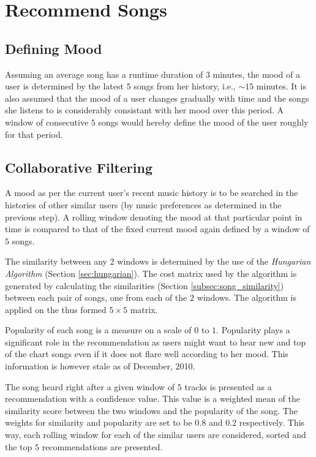 	\section{Recommend Songs}
	\label{sec:recommend}
		\subsection{Defining Mood}
			Assuming an average song has a runtime duration of \(3\) minutes, the mood of a user is determined by the latest \(5\) songs from her history, i.e., $\sim$\(15\) minutes. It is also assumed that the mood of a user changes gradually with time and the songs she listens to is considerably consistant with her mood over this period. A window of consecutive \(5\) songs would hereby define the mood of the user roughly for that period.
			
		\subsection{Collaborative Filtering}
			A mood as per the current user's recent music history is to be searched in the histories of other similar users (by music preferences as determined in the previous step). A rolling window denoting the mood at that particular point in time is compared to that of the fixed current mood again defined by a window of \(5\) songs.
			
			The similarity between any \(2\) windows is determined by the use of the \emph{Hungarian Algorithm} (Section \ref{sec:hungarian}). The cost matrix used by the algorithm is generated by calculating the similarities (Section \ref{subsec:song_similarity}) between each pair of songs, one from each of the \(2\) windows. The algorithm is applied on the thus formed \(5 \times 5\) matrix.
			
			Popularity of each song is a measure on a scale of \(0\) to \(1\). Popularity plays a significant role in the recommendation as users might want to hear new and top of the chart songs even if it does not flare well according to her mood. This information is however stale as of December, 2010.
			
			The song heard right after a given window of \(5\) tracks is presented as a recommendation with a confidence value. This value is a weighted mean of the similarity score between the two windows and the popularity of the song. The weights for similarity and popularity are set to be \(0.8\) and \(0.2\) respectively. This way, each rolling window for each of the similar users are considered, sorted and the top \(5\) recommendations are presented.
			
